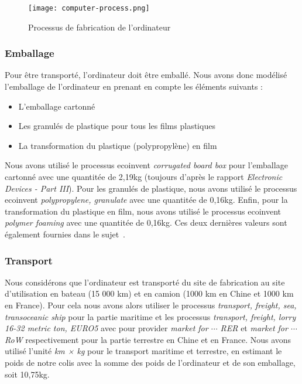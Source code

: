 \documentclass[12pt,a4paper]{paper}
\begin{document}
\begin{figure}[b!]
    \centering
    \texttt{[image: computer-process.png]}
    \caption{Processus de fabrication de l'ordinateur}
    \label{fig:computer-process}
\end{figure}
\subsubsection{Emballage}
Pour être transporté, l'ordinateur doit être emballé. Nous avons donc modélisé l'emballage de l'ordinateur en prenant en compte les éléments suivants :
\begin{itemize}
    \item L'emballage cartonné
    \item Les granulés de plastique pour tous les films plastiques
    \item La transformation du plastique (polypropylène) en film
\end{itemize}
Nous avons utilisé le processus ecoinvent \textit{corrugated board box} pour l'emballage cartonné avec une quantitée de 2,19kg (toujours d'après le rapport \textit{Electronic Devices - Part III}\cite{Lehmann2007}). Pour les granulés de plastique, nous avons utilisé le processus ecoinvent \textit{polypropylene,
granulate} avec une quantitée de 0,16kg. Enfin, pour la transformation du plastique en film, nous avons utilisé le processus ecoinvent \textit{polymer foaming} avec une quantitée de 0,16kg. Ces deux dernières valeurs sont également fournies dans le sujet~\cite{TP2_ACV_ENSEIRB-MATMECA}.

\subsubsection{Transport}
Nous considérons que l'ordinateur est transporté du site de fabrication au site d'utilisation en bateau (15 000 km) et en camion (1000 km en Chine et 1000 km en France). Pour cela nous avons alors utiliser le processus \textit{transport, freight, sea, transoceanic ship} pour la partie maritime et les processus \textit{transport, freight, lorry 16-32 metric ton, EURO5} avec pour provider \textit{market for $\cdots$ RER} et \textit{market for $\cdots$ RoW} respectivement pour la partie terrestre en Chine et en France. Nous avons utilisé l'unité \textit{km × kg} pour le transport maritime et terrestre, en estimant le poids de notre colis avec la somme des poids de l'ordinateur et de son emballage, soit 10,75kg.
\end{document}

